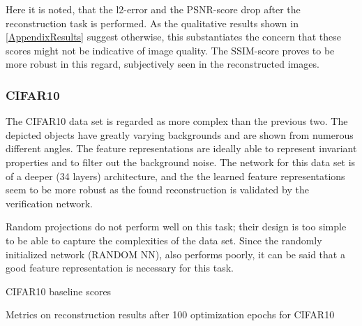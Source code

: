 Here it is noted, that the l2-error and the PSNR-score 
drop after the reconstruction task is performed.
As the qualitative results shown in \cref{AppendixResults} suggest otherwise,
this substantiates the concern that these scores might not be indicative of image quality.
The SSIM-score proves to be more robust in this regard, subjectively seen in the reconstructed images.



\subsubsection{CIFAR10}

The CIFAR10 data set is regarded as more complex than the previous two.
The depicted objects have greatly varying backgrounds and are shown from numerous different angles.
The feature representations are ideally able to represent invariant properties and to 
filter out the background noise.
The network for this data set is of a deeper (34 layers) architecture, and the
the learned feature representations seem to be more robust 
as the found reconstruction is validated by the verification network.

Random projections do not perform well on this task;
their design is too simple to be able to capture the complexities of the data set.
Since the randomly initialized network (RANDOM NN), 
also performs poorly,
it can be said that a good feature representation is necessary for this task.

\begin{table}[!htbp]
\centering
\footnotesize
{}
\caption{CIFAR10 baseline scores}
\label{tab:cifar10baseline}
\end{table}

\begin{table}[!htbp]
\centering
\footnotesize
{}
\caption{Metrics on reconstruction results after 100 optimization epochs for CIFAR10}
\label{tab:cifar10results}
\end{table}





